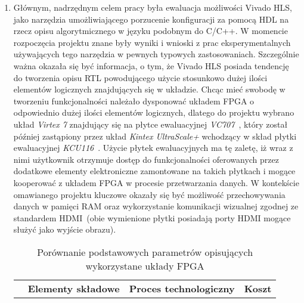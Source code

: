 \begin{enumerate}
\item Głównym, nadrzędnym celem pracy była ewaluacja możliwości Vivado HLS, jako narzędzia umożliwiającego porzucenie konfiguracji za pomocą HDL na rzecz opisu algorytmicznego w języku podobnym do C/C++. W momencie rozpoczęcia projektu znane były wyniki i wnioski z prac eksperymentalnych używających tego narzędzia w pewnych typowych zastosowaniach. Szczególnie ważna okazała się być informacja, o tym, że Vivado HLS posiada tendencję do tworzenia opisu RTL powodującego użycie stosunkowo dużej ilości elementów logicznych znajdujących się w układzie. Chcąc mieć swobodę w tworzeniu funkcjonalności należało dysponować układem FPGA o odpowiednio dużej ilości elementów logicznych, dlatego do projektu wybrano układ \textit{Virtex 7} znajdujący się na płytce ewaluacyjnej \textit{VC707}~\cite{VC707_UG}, który został później zastąpiony przez układ \textit{Kintex UltraScale+} wchodzący w skład płytki ewaluacyjnej \textit{KCU116}~\cite{KCU116_UG}. 
Użycie płytek ewaluacyjnych ma tę zaletę, iż wraz z nimi użytkownik otrzymuje dostęp do funkcjonalności oferowanych przez dodatkowe elementy elektroniczne zamontowane na takich płytkach i mogące kooperować z układem FPGA w procesie przetwarzania danych. W kontekście omawianego projektu kluczowe okazały się być możliwość przechowywania danych w pamięci RAM oraz wykorzystanie komunikacji wizualnej zgodnej ze standardem HDMI~(obie wymienione płytki posiadają porty HDMI mogące służyć jako wyjście obrazu).
\begin{savenotes}
\begin{table}[H]
\centering
\caption{Porównanie podstawowych parametrów opisujących wykorzystane układy FPGA}
\label{ch3:tab:fpga_comp}
\begin{tabular}{|r|c|c|c|c|c|c|}
\hline
\multirow{2}{*}{} & \multicolumn{4}{c|}{\textbf{Elementy składowe}} & \multirow{2}{*}{\textbf{Proces technologiczny}} & \multirow{2}{*}{\textbf{Koszt}} \\ \cline{2-5}

\end{tabular}
\end{table}
\end{savenotes}
\end{enumerate}
